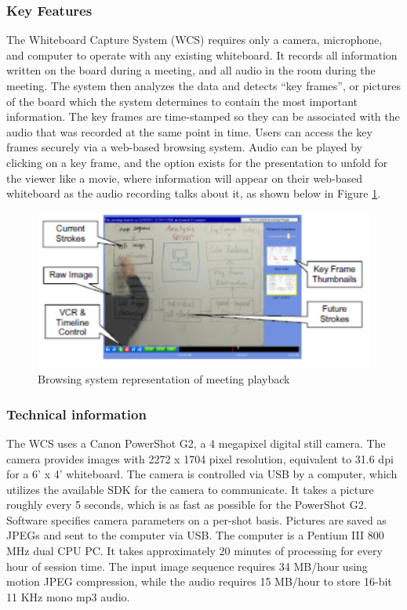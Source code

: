 \documentclass{article}
\begin{document}
		\subsubsection*{Key Features}
The Whiteboard Capture System (WCS) requires only a camera, microphone, and computer to operate with any existing whiteboard.  It records all information written on the board during a meeting, and all audio in the room during the meeting.  The system then analyzes the data and detects ``key frames'', or pictures of the board which the system determines to contain the most important information.  The key frames are time-stamped so they can be associated with the audio that was recorded at the same point in time.  Users can access the key frames securely via a web-based browsing system.  Audio can be played by clicking on a key frame, and the option exists for the presentation to unfold for the viewer like a movie, where information will appear on their web-based whiteboard as the audio recording talks about it, as shown below in Figure \ref{fig:research_mswhiteboard_1}.
    
\begin{figure}[H]
\centering
\includegraphics[scale=0.80]{images/research_mswhiteboard_1}
\caption{Browsing system representation of meeting playback}
\label{fig:research_mswhiteboard_1}
\end{figure}

		\subsubsection*{Technical information}
The WCS uses a Canon PowerShot G2, a 4 megapixel digital still camera.  The camera provides images with 2272 x 1704 pixel resolution, equivalent to 31.6 dpi for a 6' x 4' whiteboard.  The camera is controlled via USB by a computer, which utilizes the available SDK for the camera to communicate.  It takes a picture roughly every 5 seconds, which is as fast as possible for the PowerShot G2.  Software specifies camera parameters on a per-shot basis.  Pictures are saved as JPEGs and sent to the computer via USB.  The computer is a Pentium III 800 MHz dual CPU PC.  It takes approximately 20 minutes of processing for every hour of session time.  The input image sequence requires 34 MB/hour using motion JPEG compression, while the audio requires 15 MB/hour to store 16-bit 11 KHz mono mp3 audio.  \\
\end{document}

